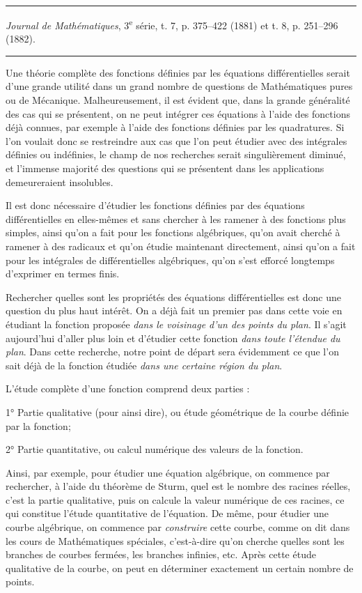 \documentclass[11pt]{article}
\newcommand{\shortline}{\begin{center}\rule{3.5em}{0.4pt}\end{center}}
\begin{document}
\shortline

\begin{center}
\emph{Journal de Mathématiques}, 3\textsuperscript{e} série, t. 7, p. 375--422 (1881) et t. 8, p. 251--296 (1882).
\end{center}

\shortline

Une théorie complète des fonctions définies par les équations différentielles serait d’une grande utilité dans un grand nombre de questions de Mathématiques pures ou de Mécanique. Malheureusement, il est évident que, dans la grande généralité des cas qui se présentent, on ne peut intégrer ces équations à l’aide des fonctions déjà connues, par exemple à l’aide des fonctions définies par les quadratures. Si l’on voulait donc se restreindre aux cas que l’on peut étudier avec des intégrales définies ou indéfinies, le champ de nos recherches serait singulièrement diminué, et l’immense majorité des questions qui se présentent dans les applications demeureraient insolubles.

Il est donc nécessaire d’étudier les fonctions définies par des équations différentielles en elles-mêmes et sans chercher à les ramener à des fonctions plus simples, ainsi qu’on a fait pour les fonctions algébriques, qu’on avait cherché à ramener à des radicaux et qu’on étudie maintenant directement, ainsi qu’on a fait pour les intégrales de différentielles algébriques, qu’on s’est efforcé longtemps d’exprimer en termes finis.

Rechercher quelles sont les propriétés des équations différentielles est donc une question du plus haut intérêt. On a déjà fait un premier pas dans cette voie en étudiant la fonction proposée \emph{dans le voisinage d’un des points du plan}. Il s’agit aujourd’hui d’aller plus loin et d’étudier cette fonction \emph{dans toute l’étendue du plan}. Dans cette recherche, notre point de départ sera évidemment ce que l’on sait déjà de la fonction étudiée \emph{dans une certaine région du plan}.

L’étude complète d’une fonction comprend deux parties :

1° Partie qualitative (pour ainsi dire), ou étude géométrique de la courbe définie par la fonction;

2° Partie quantitative, ou calcul numérique des valeurs de la fonction.

Ainsi, par exemple, pour étudier une équation algébrique, on commence par rechercher, à l’aide du théorème de Sturm, quel est le nombre des racines réelles, c’est la partie qualitative, puis on calcule la valeur numérique de ces racines, ce qui constitue l’étude quantitative de l’équation. De même, pour étudier une courbe algébrique, on commence par \emph{construire} cette courbe, comme on dit dans les cours de Mathématiques spéciales, c’est-à-dire qu’on cherche quelles sont les branches de courbes fermées, les branches infinies, etc. Après cette étude qualitative de la courbe, on peut en déterminer exactement un certain nombre de points.
\end{document}

